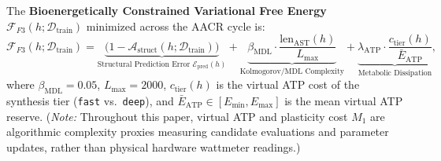 \documentclass[10pt,a4paper]{article}
\begin{document}
The \textbf{Bioenergetically Constrained Variational Free Energy} $\mathcal{F}_{F3}(h; \mathcal{D}_{\text{train}})$ minimized across the AACR cycle is:
\begin{equation}
\label{eq:free_energy_f3}
\mathcal{F}_{F3}(h; \mathcal{D}_{\text{train}}) = \underbrace{\big(1 - \mathcal{A}_{\text{struct}}(h; \mathcal{D}_{\text{train}})\big)}_{\text{Structural Prediction Error } \mathcal{E}_{\text{pred}}(h)} + \underbrace{\beta_{\text{MDL}} \cdot \frac{\text{len}_{\text{AST}}(h)}{L_{\max}}}_{\text{Kolmogorov/MDL Complexity}} + \underbrace{\lambda_{\text{ATP}} \cdot \frac{c_{\text{tier}}(h)}{\bar{E}_{\text{ATP}}}}_{\text{Metabolic Dissipation}},
\end{equation}
where $\beta_{\text{MDL}} = 0.05$, $L_{\max} = 2000$, $c_{\text{tier}}(h)$ is the virtual ATP cost of the synthesis tier (\texttt{fast} vs.\ \texttt{deep}), and $\bar{E}_{\text{ATP}} \in [E_{\min}, E_{\max}]$ is the mean virtual ATP reserve. (\emph{Note:} Throughout this paper, virtual ATP and plasticity cost $M_1$ are algorithmic complexity proxies measuring candidate evaluations and parameter updates, rather than physical hardware wattmeter readings.)
\end{document}
